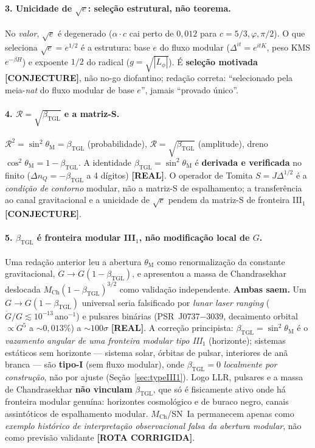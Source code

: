 \documentclass[12pt,a4paper]{article}
\newcommand{\betatgl}{\beta_{\text{TGL}}}
\begin{document}
\paragraph{3. Unicidade de $\sqrt{e}$: seleção estrutural, não teorema.} No \emph{valor}, $\sqrt{e}$ é degenerado ($\alpha\cdot c$ cai perto de $0{,}012$ para $c=5/3,\varphi,\pi/2$).  O que seleciona $\sqrt{e}=e^{1/2}$ é a estrutura: base $e$ do fluxo modular ($\Delta^{it}=e^{itK}$, peso KMS $e^{-\beta H}$) e expoente $1/2$ do radical ($g=\sqrt{|L_\phi|}$).  É \textbf{seleção motivada [CONJECTURE]}, não no-go diofantino; redação correta: ``selecionado pela meia-\emph{nat} do fluxo modular de base $e$'', jamais ``provado único''.

\paragraph{4. $\mathcal{R}=\sqrt{\betatgl}$ e a matriz-S.} $\mathcal{R}^2=\sin^2\theta_{\mathrm{M}}=\betatgl$ (probabilidade), $\mathcal{R}=\sqrt{\betatgl}$ (amplitude), dreno $\cos^2\theta_{\mathrm{M}}=1-\betatgl$.  A identidade $\betatgl=\sin^2\theta_{\mathrm{M}}$ é \textbf{derivada e verificada} no finito ($\Delta n_Q=-\betatgl$ a 4 dígitos) \textbf{[REAL]}.  O operador de Tomita $S=J\Delta^{1/2}$ é a \emph{condição de contorno} modular, não a matriz-S de espalhamento; a transferência ao canal gravitacional e a unicidade de $\sqrt{e}$ pendem da matriz-S de fronteira III$_1$ \textbf{[CONJECTURE]}.

\paragraph{5. $\betatgl$ é fronteira modular III$_1$, não modificação local de $G$.} Uma redação anterior leu a abertura $\theta_{\mathrm{M}}$ como renormalização da constante gravitacional, $G\to G(1-\betatgl)$, e apresentou a massa de Chandrasekhar deslocada $M_{\mathrm{Ch}}(1-\betatgl)^{3/2}$ como validação independente.  \textbf{Ambas saem.}  Um $G\to G(1-\betatgl)$ universal seria falsificado por \emph{lunar laser ranging} ($\dot G/G\lesssim10^{-13}\,$ano$^{-1}$) e pulsares binárias (PSR~J0737$-$3039, decaimento orbital $\propto G^5$ a $\sim0{,}013\%$) a $\sim100\sigma$ \textbf{[REAL]}.  A correção principista: $\betatgl=\sin^2\theta_{\mathrm{M}}$ é o \emph{vazamento angular de uma fronteira modular tipo III$_1$} (horizonte); sistemas estáticos sem horizonte --- sistema solar, órbitas de pulsar, interiores de anã branca --- são \textbf{tipo-I} (sem fluxo modular), onde $\betatgl=0$ \emph{localmente por construção}, não por ajuste (Seção~\ref{sec:typeIII1}).  Logo LLR, pulsares e a massa de Chandrasekhar \textbf{não vinculam} $\betatgl$, que só é fisicamente ativo onde há fronteira modular genuína: horizontes cosmológico e de buraco negro, canais assintóticos de espalhamento modular.  $M_{\mathrm{Ch}}$/SN~Ia permanecem apenas como \emph{exemplo histórico de interpretação observacional falsa da abertura modular}, não como previsão validante \textbf{[ROTA CORRIGIDA]}.
\end{document}
